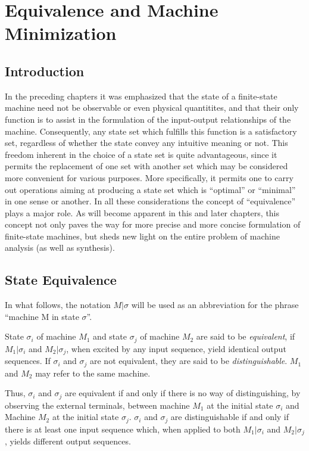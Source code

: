 \documentclass[a4paper]{report}
\begin{document}
\chapter{Equivalence and Machine Minimization}
\section{Introduction}

In the preceding chapters it was emphasized that the state of a finite-state machine need not be observable or even physical quantitites, and that their only function is to assist in the formulation of the input-output relationships of the machine. Consequently, any state set which fulfills this function is a satisfactory set, regardless of whether the state convey any intuitive meaning or not. This freedom inherent in the choice of a state set is quite advantageous, since it permits the replacement of one set with another set which may be considered more convenient for various purposes. More specifically, it permits one to carry out operations aiming at producing a state set which is ``optimal'' or ``minimal'' in one sense or another. In all these considerations the concept of ``equivalence'' plays a major role. As will become apparent in this and later chapters, this concept not only paves the way for more precise and more concise formulation of finite-state machines, but sheds new light on the entire problem of machine analysis (as well as synthesis).

\section{State Equivalence}

In what follows, the notation $ M |\sigma $ will be used as an abbreviation for the phrase ``machine M in state $\sigma$''.

 \label{labelEquivalence}  State $ \sigma_i $ of machine $M_1$ and state $\sigma_j$ of machine $M_2$ are said to be \emph{equivalent}, if $M_1|\sigma_i$ and $M_2|\sigma_j$, when excited by any input sequence, yield identical output sequences. If $\sigma_i$ and $\sigma_j$ are not equivalent, they are said to be \emph{distinguishable}. $M_1$ and $M_2$ may refer to the same machine.

    Thus, $\sigma_i$ and $\sigma_j$ are equivalent if and only if there is no way of distinguishing, by observing the external terminals, between machine $M_1$ at the initial state $\sigma_i$ and Machine $M_2$ at the initial state $\sigma_j$. $\sigma_i$ and $\sigma_j$ are distinguishable if and only if there is at least one input sequence which, when applied to both $M_1|\sigma_i$ and $M_2|\sigma_j$, yields different output sequences.
\end{document}
